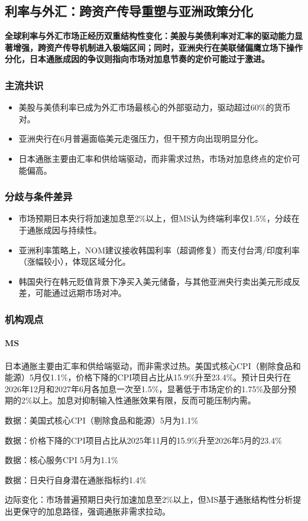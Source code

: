 \documentclass[11pt]{ctexart}
\begin{document}
\subsection{利率与外汇：跨资产传导重塑与亚洲政策分化}
\textbf{全球利率与外汇市场正经历双重结构性变化：美股与美债利率对汇率的驱动能力显著增强，跨资产传导机制进入极端区间；同时，亚洲央行在美联储偏鹰立场下操作分化，日本通胀成因的争议则指向市场对加息节奏的定价可能过于激进。}
\subsubsection*{主流共识}
\begin{itemize}
  \item 美股与美债利率已成为外汇市场最核心的外部驱动力，驱动超过60\%的货币对。
  \item 亚洲央行在6月普遍面临美元走强压力，但干预方向出现明显分化。
  \item 日本通胀主要由汇率和供给端驱动，而非需求过热，市场对加息终点的定价可能偏高。
\end{itemize}
\subsubsection*{分歧与条件差异}
\begin{itemize}
  \item 市场预期日本央行将加速加息至2\%以上，但MS认为终端利率仅1.5\%，分歧在于通胀成因与持续性。
  \item 亚洲利率策略上，NOM建议接收韩国利率（超调修复）而支付台湾/印度利率（涨幅较小），体现区域分化。
  \item 韩国央行在韩元贬值背景下净买入美元储备，与其他亚洲央行卖出美元形成反差，可能通过远期市场对冲。
\end{itemize}
\subsubsection*{机构观点}
\paragraph{MS} 日本通胀主要由汇率和供给端驱动，而非需求过热。美国式核心CPI（剔除食品和能源）5月仅1.1\%，价格下降的CPI项目占比从15.9\%升至23.4\%。预计日央行在2026年12月和2027年6月各加息一次至1.5\%，显著低于市场定价的1.75\%及部分预期的2\%以上。加息对抑制输入性通胀效果有限，反而可能压制内需。
{\small\color{refgray}数据：美国式核心CPI（剔除食品和能源）5月为1.1\%\par}
{\small\color{refgray}数据：价格下降的CPI项目占比从2025年11月的15.9\%升至2026年5月的23.4\%\par}
{\small\color{refgray}数据：核心服务CPI 5月为1.1\%\par}
{\small\color{refgray}数据：日央行自身潜在通胀指标约1.4\%\par}
{\small\color{refgray}边际变化：市场普遍预期日央行加速加息至2\%以上，但MS基于通胀结构性分析提出更保守的加息路径，强调通胀非需求拉动。\par}
\end{document}
